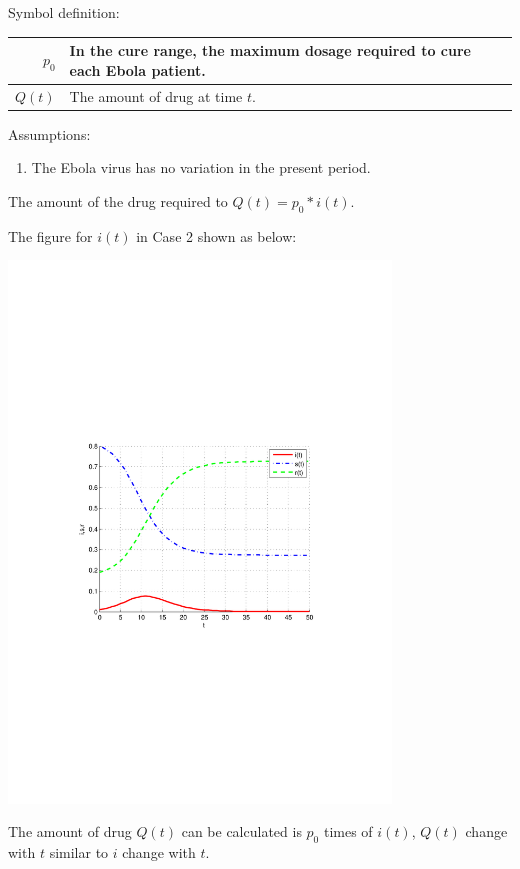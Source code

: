 Symbol definition:
\begin{center}
\begin{tabular}{|r|p{8cm}|}
\hline
$ p_0 $ & In the cure range, the maximum dosage required to
cure each Ebola patient.\\
\hline
$ Q(t) $ & The amount of drug at time $t$.\\
\hline
\end{tabular}
\end{center}%
Assumptions:
\begin{enumerate}
  \item The Ebola virus has no variation in the present period.
\end{enumerate}
The amount of the drug required to $ Q(t)=p_0*i(t) $.\par
The figure for $ i(t) $ in Case 2 shown as below:
\begin{center}
\includegraphics[width=4in]{imgs/sars3_1.pdf}
\end{center}
The amount of drug $Q(t)$ can be calculated is $p_0$ times of
$i(t)$, $Q(t)$ change with $t$ similar to $i$ change with $t$.
